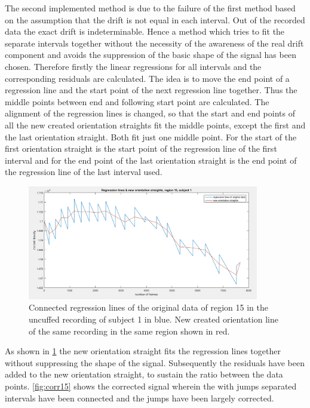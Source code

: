 The second implemented method is due to the failure of the first method based on the assumption that the drift is not equal in each interval. Out of the recorded data the exact drift is indeterminable. Hence a method which tries to fit the separate intervals together without the necessity of the awareness of the real drift component and avoids the suppression of the basic shape of the signal has been chosen.
Therefore firstly the linear regressions for all intervals and the corresponding residuals are calculated.
The idea is to move the end point of a regression line and the start point of the next regression line together. Thus the middle points between end and following start point are calculated. The alignment of the regression lines is changed, so that the start and end points of all the new created orientation straights fit the middle points, except the first and the last orientation straight. Both fit just one middle point. For the start of the first orientation straight is the start point of the regression line of the first interval and for the end point of the last orientation straight is the end point of the regression line of the last interval used.
\begin{figure}[H]
	\includegraphics[width=0.9\textwidth]{figures/reg15}
	\caption{Connected regression lines of the original data of region 15 in the uncuffed recording of subject 1 in blue. New created orientation line of the same recording in the same region shown in red.}
	\label{fig:reg15}
\end{figure}
As shown in \ref{fig:reg15} the new orientation straight fits the regression lines together without suppressing the shape of the signal. Subsequently the residuals have been added to the new orientation straight, to sustain the ratio between the data points. \ref{fig:corr15} shows the corrected signal wherein the with jumps separated intervals have been connected and the jumps have been largely corrected.
